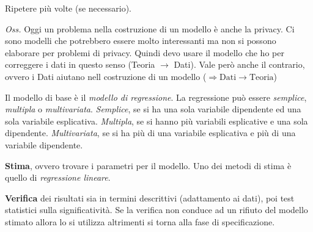 Ripetere più volte (se necessario).

\emph{Oss.} Oggi un problema nella costruzione di un modello è anche la
privacy. Ci sono modelli che potrebbero essere molto interessanti ma non
si possono elaborare per problemi di privacy. Quindi devo usare il
modello che ho per correggere i dati in questo senso (Teoria
\(\rightarrow\) Dati). Vale però anche il contrario, ovvero i Dati
aiutano nell costruzione di un modello
(\(\Rightarrow \text{Dati} \rightarrow \text{Teoria}\))

Il modello di base è il \emph{modello di regressione}. La regressione
può essere \emph{semplice}, \emph{multipla} o \emph{multivariata}.
\emph{Semplice}, se si ha una sola variabile dipendente ed una sola
variabile esplicativa. \emph{Multipla}, se si hanno più variabili
esplicative e una sola dipendente. \emph{Multivariata}, se si ha più di
una variabile esplicativa e più di una variabile dipendente.

\textbf{Stima}, ovvero trovare i parametri per il modello. Uno dei
metodi di stima è quello di \emph{regressione lineare}.

\textbf{Verifica} dei risultati sia in termini descrittivi (adattamento
ai dati), poi test statistici sulla significatività. Se la verifica non
conduce ad un rifiuto del modello stimato allora lo si utilizza
altrimenti si torna alla fase di specificazione. 
